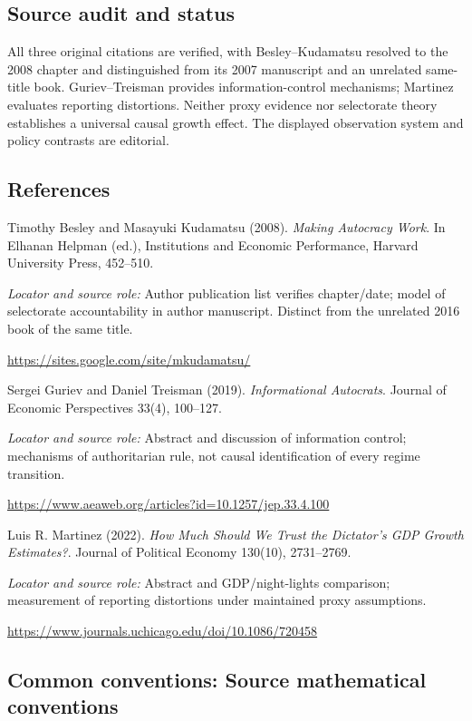 \documentclass[11pt,a4paper]{article}
\begin{document}
\subsection*{Source audit and status}
All three original citations are verified, with Besley--Kudamatsu resolved to the 2008 chapter and distinguished from its 2007 manuscript and an unrelated same-title book. Guriev--Treisman provides information-control mechanisms; Martinez evaluates reporting distortions. Neither proxy evidence nor selectorate theory establishes a universal causal growth effect. The displayed observation system and policy contrasts are editorial.
\subsection*{References}
{\footnotesize\raggedright
\begin{enumerate}[label={\textbf{[S\arabic*]}},leftmargin=3em]
\item Timothy Besley and Masayuki Kudamatsu (2008). \emph{Making Autocracy Work}. In Elhanan Helpman (ed.), Institutions and Economic Performance, Harvard University Press, 452--510.\par
\textit{Locator and source role:} Author publication list verifies chapter/date; model of selectorate accountability in author manuscript. Distinct from the unrelated 2016 book of the same title.\par
\url{https://sites.google.com/site/mkudamatsu/}
\item Sergei Guriev and Daniel Treisman (2019). \emph{Informational Autocrats}. Journal of Economic Perspectives 33(4), 100--127.\par
\textit{Locator and source role:} Abstract and discussion of information control; mechanisms of authoritarian rule, not causal identification of every regime transition.\par
\url{https://www.aeaweb.org/articles?id=10.1257/jep.33.4.100}
\item Luis R. Martinez (2022). \emph{How Much Should We Trust the Dictator's GDP Growth Estimates?}. Journal of Political Economy 130(10), 2731--2769.\par
\textit{Locator and source role:} Abstract and GDP/night-lights comparison; measurement of reporting distortions under maintained proxy assumptions.\par
\url{https://www.journals.uchicago.edu/doi/10.1086/720458}
\end{enumerate}
}

\subsection*{Common conventions: Source mathematical conventions}
\end{document}
